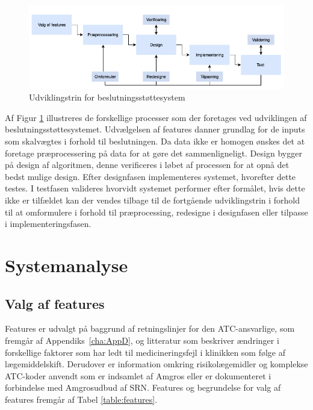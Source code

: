 \begin{figure}[H]\centering	\includegraphics[width=1\textwidth]{billeder/udviklingstrin.png} 
	\caption{Udviklingstrin for beslutningsstøttesystem}
	\label{fig:metode}  
\end{figure}
\vspace{-0.5cm}

Af Figur \ref{fig:metode} illustreres de forskellige processer som der foretages ved udviklingen af beslutningsstøttesystemet. Udvælgelsen af features danner grundlag for de inputs som skalvægtes i forhold til beslutningen. Da data ikke er homogen ønskes det at foretage præprocessering på data for at gøre det sammenligneligt. Design bygger på design af algoritmen, denne verificeres i løbet af processen for at opnå det bedst mulige design. Efter designfasen implementeres systemet, hvorefter dette testes. I testfasen valideres hvorvidt systemet performer efter formålet, hvis dette ikke er tilfældet kan der vendes tilbage til de fortgående udviklingstrin i forhold til at omformulere i forhold til præprocessing, redesigne i designfasen eller tilpasse i implementeringsfasen. 





\chapter{Systemanalyse}
\section{Valg af features}
Features er udvalgt på baggrund af retningslinjer for den ATC-ansvarlige, som fremgår af Appendiks~\ref{cha:AppD}, og litteratur som beskriver ændringer i forskellige faktorer som har ledt til medicineringsfejl i klinikken som følge af lægemiddelskift. Derudover er information omkring risikolægemidler og komplekse ATC-koder anvendt som er indsamlet af Amgros eller er dokumenteret i forbindelse med Amgrosudbud af SRN.
Features og begrundelse for valg af features fremgår af Tabel \ref{table:features}.

